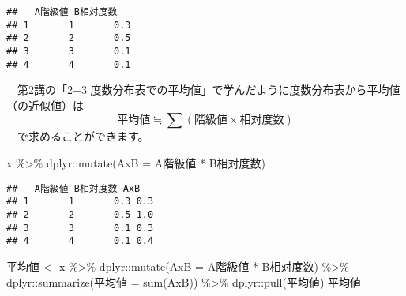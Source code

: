 \documentclass[
  12pt,
]{book}
\newenvironment{Shaded}{\begin{snugshade}}{\end{snugshade}}
\newcommand{\AttributeTok}[1]{\textcolor[rgb]{0.77,0.63,0.00}{#1}}
\newcommand{\FunctionTok}[1]{\textcolor[rgb]{0.00,0.00,0.00}{#1}}
\newcommand{\NormalTok}[1]{#1}
\newcommand{\OtherTok}[1]{\textcolor[rgb]{0.56,0.35,0.01}{#1}}
\newcommand{\SpecialCharTok}[1]{\textcolor[rgb]{0.00,0.00,0.00}{#1}}
\newcommand{\StringTok}[1]{\textcolor[rgb]{0.31,0.60,0.02}{#1}}
\begin{document}
\begin{verbatim}
##   A階級値 B相対度数
## 1       1       0.3
## 2       2       0.5
## 3       3       0.1
## 4       4       0.1
\end{verbatim}

　第2講の「2−3 度数分布表での平均値」で学んだように度数分布表から平均値（の近似値）は \[\mbox{平均値} \fallingdotseq \sum{(\mbox{階級値} \times \mbox{相対度数})}\] 　で求めることができます。

\begin{Shaded}
\begin{Highlighting}[]
\NormalTok{x }\SpecialCharTok{\%\textgreater{}\%} 
\NormalTok{  dplyr}\SpecialCharTok{::}\FunctionTok{mutate}\NormalTok{(}\StringTok{\textasciigrave{}}\AttributeTok{AxB}\StringTok{\textasciigrave{}} \OtherTok{=} \StringTok{\textasciigrave{}}\AttributeTok{A階級値}\StringTok{\textasciigrave{}} \SpecialCharTok{*} \StringTok{\textasciigrave{}}\AttributeTok{B相対度数}\StringTok{\textasciigrave{}}\NormalTok{)}
\end{Highlighting}
\end{Shaded}

\begin{verbatim}
##   A階級値 B相対度数 AxB
## 1       1       0.3 0.3
## 2       2       0.5 1.0
## 3       3       0.1 0.3
## 4       4       0.1 0.4
\end{verbatim}

\begin{Shaded}
\begin{Highlighting}[]
\StringTok{\textasciigrave{}}\AttributeTok{平均値}\StringTok{\textasciigrave{}} \OtherTok{\textless{}{-}}\NormalTok{ x }\SpecialCharTok{\%\textgreater{}\%} 
\NormalTok{  dplyr}\SpecialCharTok{::}\FunctionTok{mutate}\NormalTok{(}\StringTok{\textasciigrave{}}\AttributeTok{AxB}\StringTok{\textasciigrave{}} \OtherTok{=} \StringTok{\textasciigrave{}}\AttributeTok{A階級値}\StringTok{\textasciigrave{}} \SpecialCharTok{*} \StringTok{\textasciigrave{}}\AttributeTok{B相対度数}\StringTok{\textasciigrave{}}\NormalTok{) }\SpecialCharTok{\%\textgreater{}\%} 
\NormalTok{  dplyr}\SpecialCharTok{::}\FunctionTok{summarize}\NormalTok{(}\StringTok{\textasciigrave{}}\AttributeTok{平均値}\StringTok{\textasciigrave{}} \OtherTok{=} \FunctionTok{sum}\NormalTok{(}\StringTok{\textasciigrave{}}\AttributeTok{AxB}\StringTok{\textasciigrave{}}\NormalTok{)) }\SpecialCharTok{\%\textgreater{}\%} 
\NormalTok{  dplyr}\SpecialCharTok{::}\FunctionTok{pull}\NormalTok{(}\StringTok{\textasciigrave{}}\AttributeTok{平均値}\StringTok{\textasciigrave{}}\NormalTok{)}
\StringTok{\textasciigrave{}}\AttributeTok{平均値}\StringTok{\textasciigrave{}}
\end{Highlighting}
\end{Shaded}
\end{document}
